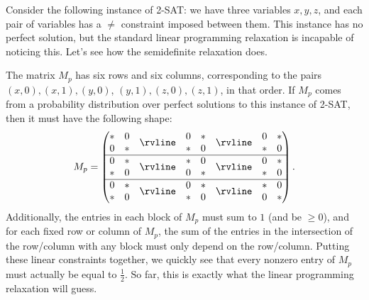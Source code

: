 \begin{ex} Consider the following instance of 2-SAT: we have three variables $x,y,z$, and each pair of variables has a $\ne$ constraint imposed between them. This instance has no perfect solution, but the standard linear programming relaxation is incapable of noticing this. Let's see how the semidefinite relaxation does.

The matrix $M_p$ has six rows and six columns, corresponding to the pairs $(x,0),(x,1),(y,0)$, $(y,1),(z,0),(z,1)$, in that order. If $M_p$ comes from a probability distribution over perfect solutions to this instance of 2-SAT, then it must have the following shape:
\[
M_p = \begin{pmatrix}\begin{matrix} * & 0\\ 0 & *\end{matrix} & \rvline & \begin{matrix} 0 & *\\ * & 0\end{matrix} & \rvline & \begin{matrix} 0 & *\\ * & 0\end{matrix}\\
\hline \begin{matrix} 0 & *\\ * & 0\end{matrix} & \rvline & \begin{matrix} * & 0\\ 0 & *\end{matrix} & \rvline & \begin{matrix} 0 & *\\ * & 0\end{matrix}\\
\hline \begin{matrix} 0 & *\\ * & 0\end{matrix} & \rvline & \begin{matrix} 0 & *\\ * & 0\end{matrix} & \rvline & \begin{matrix} * & 0\\ 0 & *\end{matrix}\end{pmatrix}.
\]
Additionally, the entries in each block of $M_p$ must sum to $1$ (and be $\ge 0$), and for each fixed row or column of $M_p$, the sum of the entries in the intersection of the row/column with any block must only depend on the row/column. Putting these linear constraints together, we quickly see that every nonzero entry of $M_p$ must actually be equal to $\frac{1}{2}$. So far, this is exactly what the linear programming relaxation will guess.


\end{ex}
